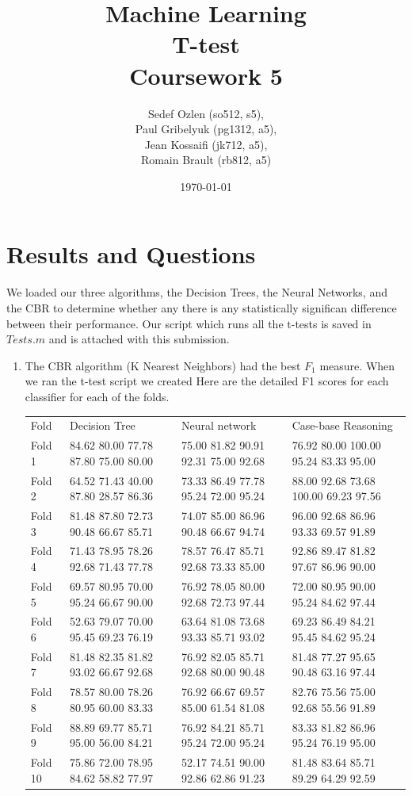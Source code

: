 \documentclass[a4paper,12pt,oneside,final]{report}
\author{
    Sedef Ozlen (so512, s5), \\ 
    Paul Gribelyuk (pg1312, a5), \\
    Jean Kossaifi (jk712, a5), \\ 
    Romain Brault (rb812, a5)
}
\title{\Huge Machine Learning \\ T-test \\ Coursework 5}
\date{\today}
\begin{document}
\maketitle
\tableofcontents
\listoffigures


\chapter{Results and Questions}
We loaded our three algorithms, the Decision Trees, the Neural Networks, and the CBR to determine whether any there is any statistically significan difference between their performance.  Our script which runs all the t-tests is saved in $Tests.m$ and is attached with this submission.
\begin{enumerate}
\item The CBR algorithm (K Nearest Neighbors) had the best $F_1$ measure.  When we ran the t-test script we created
Here are the detailed F1 scores for each classifier for each of the folds.

\begin{tabular}{llll}

Fold   &     Decision Tree                          &    Neural network                          &   Case-base Reasoning                        \\
Fold 1 &  84.62  80.00  77.78  87.80  75.00  80.00  &  75.00  81.82  90.91  92.31  75.00  92.68  &  76.92  80.00  100.00  95.24  83.33  95.00   \\ 
Fold 2 &  64.52  71.43  40.00  87.80  28.57  86.36  &  73.33  86.49  77.78  95.24  72.00  95.24  &  88.00  92.68  73.68  100.00  69.23  97.56   \\ 
Fold 3 &  81.48  87.80  72.73  90.48  66.67  85.71  &  74.07  85.00  86.96  90.48  66.67  94.74  &  96.00  92.68  86.96  93.33  69.57  91.89   \\ 
Fold 4 &  71.43  78.95  78.26  92.68  71.43  77.78  &  78.57  76.47  85.71  92.68  73.33  85.00  &  92.86  89.47  81.82  97.67  86.96  90.00   \\ 
Fold 5 &  69.57  80.95  70.00  95.24  66.67  90.00  &  76.92  78.05  80.00  92.68  72.73  97.44  &  72.00  80.95  90.00  95.24  84.62  97.44   \\ 
Fold 6 &  52.63  79.07  70.00  95.45  69.23  76.19  &  63.64  81.08  73.68  93.33  85.71  93.02  &  69.23  86.49  84.21  95.45  84.62  95.24   \\ 
Fold 7 &  81.48  82.35  81.82  93.02  66.67  92.68  &  76.92  82.05  85.71  92.68  80.00  90.48  &  81.48  77.27  95.65  90.48  63.16  97.44   \\ 
Fold 8 &  78.57  80.00  78.26  80.95  60.00  83.33  &  76.92  66.67  69.57  85.00  61.54  81.08  & 82.76  75.56  75.00  92.68  55.56  91.89   \\ 
Fold 9 &  88.89  69.77  85.71  95.00  56.00  84.21  &  76.92  84.21  85.71  95.24  72.00  95.24  &  83.33  81.82  86.96  95.24  76.19  95.00   \\ 
Fold 10 &  75.86  72.00  78.95  84.62  58.82  77.97  &  52.17  74.51  90.00  92.86  62.86  91.23  &  81.48  83.64  85.71  89.29  64.29  92.59   \\ 


\end{tabular}
\end{enumerate}
\end{document}
